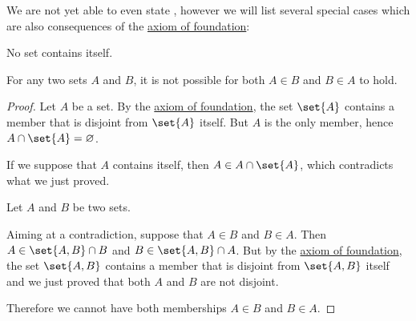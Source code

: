 \begin{proposition}\label{thm:simple_foundation_theorems}
  We are not yet able to even state , however we will list several special cases which are also consequences of the \hyperref[def:zfc/foundation]{axiom of foundation}:

  \begin{thmenum}
     No set contains itself.

     For any two sets \( A \) and \( B \), it is not possible for both \( A \in B \) and \( B \in A \) to hold.
  \end{thmenum}
\end{proposition}
\begin{proof}
   Let \( A \) be a set. By the \hyperref[def:zfc/foundation]{axiom of foundation}, the set \( \set{ A } \) contains a member that is disjoint from \( \set{ A } \) itself. But \( A \) is the only member, hence \( A \cap \set{ A } = \varnothing \).

  If we suppose that \( A \) contains itself, then \( A \in A \cap \set{ A } \), which contradicts what we just proved.

   Let \( A \) and \( B \) be two sets.

  Aiming at a contradiction, suppose that \( A \in B \) and \( B \in A \). Then \( A \in \set{ A, B } \cap B \) and \( B \in \set{ A, B } \cap A \). But by the \hyperref[def:zfc/foundation]{axiom of foundation}, the set \( \set{ A, B } \) contains a member that is disjoint from \( \set{ A, B } \) itself and we just proved that both \( A \) and \( B \) are not disjoint.

  Therefore we cannot have both memberships \( A \in B \) and \( B \in A \).
\end{proof}
